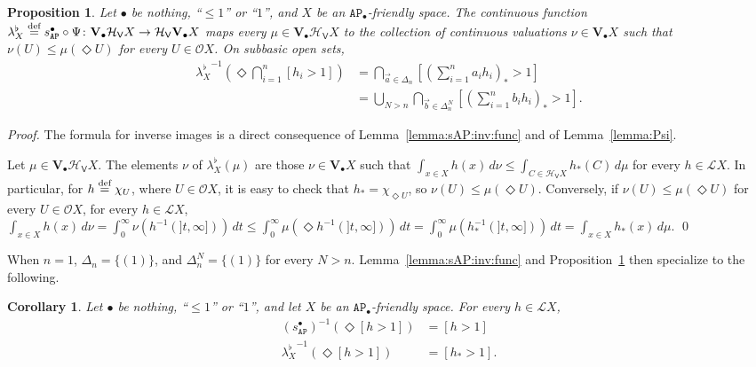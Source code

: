 \documentclass[preprint,12pt]{elsarticle}
\newcommand\eqdef{\mathrel{\buildrel \text{def}\over=}}
\newcommand\Lform{\mathcal L}
\newcommand\Angel{{\mathtt{A}}}
\newcommand\Nature{{\mathtt{P}}}
\newcommand\AN{{\Angel\Nature}}
\newcommand\Hoare{{\mathcal H}}
\newcommand\Vt{\mathsf{V}}
\newcommand\HV{\Hoare_\Vt}
\newcommand\Val{{\mathbf V}}
\newcommand\Open{{\mathcal O}}
\newtheorem{proposition}[theorem]{Proposition}
\newtheorem{corollary}[theorem]{Corollary}
\begin{document}
\begin{proposition}
  \label{prop:lambda:flat}
  Let $\bullet$ be nothing, ``$\leq 1$'' or ``$1$'', and $X$ be an
  $\AN_\bullet$-friendly space.  The continuous function
  ${\lambda^\flat_X} \eqdef s_\AN^\bullet \circ \Psi \colon
  \Val_\bullet {\HV X} \to \HV {\Val_\bullet X}$ maps every
  $\mu \in \Val_\bullet {\HV X}$ to the collection of continuous
  valuations $\nu \in \Val_\bullet X$ such that
  $\nu (U) \leq \mu (\Diamond U)$ for every $U \in \Open X$.  On
  subbasic open sets,
  \begin{align*}
    {\lambda^\flat_X}^{-1} (\Diamond {\bigcap_{i=1}^n [h_i > 1]})
    & = \bigcap_{\vec a \in \Delta_n} \left[\left(\sum_{i=1}^n a_i h_i\right)_* >
      1\right] \\
    & = \bigcup_{N > n} \bigcap_{\vec b \in \Delta_n^N} \left[\left(\sum_{i=1}^n b_i h_i\right)_* >
      1\right].
  \end{align*}
\end{proposition}
\begin{proof}
  The formula for inverse images is a direct consequence of
  Lemma~\ref{lemma:sAP:inv:func} and of Lemma~\ref{lemma:Psi}.

  Let $\mu \in \Val_\bullet {\HV X}$.
  The elements $\nu$ of ${\lambda^\flat_X} (\mu)$ are those $\nu \in
  \Val_\bullet X$ such that $\int_{x \in X} h (x)\,d\nu \leq \int_{C
    \in \HV X} h_* (C) \,d\mu$ for every $h \in \Lform X$.
  In particular, for $h \eqdef \chi_U$, where $U \in \Open X$, it is
  easy to
  check that $h_* =
  \chi_{\Diamond U}$, so $\nu (U) \leq \mu (\Diamond U)$.
  Conversely, if $\nu (U) \leq \mu (\Diamond U)$ for every $U \in
  \Open X$, for every $h \in \Lform X$,
  $\int_{x \in X} h (x)\,d\nu = \int_0^\infty \nu (h^{-1} (]t,
  \infty])) \,dt \leq \int_0^\infty \mu (\Diamond {h^{-1} (]t,
    \infty])})\,dt = \int_0^\infty \mu (h_*^{-1} (]t, \infty])) \,dt =
  \int_{x \in X} h_* (x) \,d\mu$.  \qed
\end{proof}

When $n = 1$, $\Delta_n = \{(1)\}$, and $\Delta_n^N = \{(1)\}$ for
every $N > n$.  Lemma~\ref{lemma:sAP:inv:func} and
Proposition~\ref{prop:lambda:flat} then specialize to the following.
\begin{corollary}
  \label{corl:lambda:flat:inv:func:spec}
  Let $\bullet$ be nothing, ``$\leq 1$'' or ``$1$'', and let $X$ be an
  $\AN_\bullet$-friendly space.  For every $h \in \Lform X$,
  \begin{align*}
    {(s_\AN^\bullet)}^{-1} (\Diamond {[h > 1]})
    & = [h > 1] \\
    {\lambda^\flat_X}^{-1} (\Diamond {[h > 1]})
    & = [h_* >1].
  \end{align*}
\end{corollary}
\end{document}
